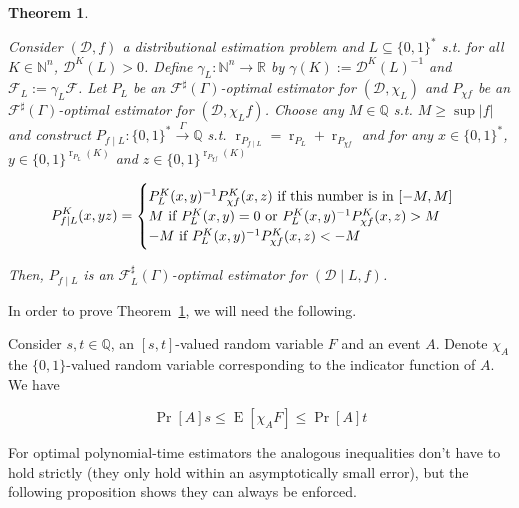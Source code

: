 \documentclass[11pt]{article}
\numberwithin{equation}{section}
\theoremstyle{definition}
\theoremstyle{plain}
\newtheorem{theorem}{Theorem}[section]
\newcommand{\Bool}{\{0,1\}}
\newcommand{\Words}{{\Bool^*}}
\DeclareMathOperator{\Prb}{Pr}
\DeclareMathOperator{\E}{E}
\DeclareMathOperator{\R}{r}
\newcommand{\Nats}{\mathbb{N}}
\newcommand{\Rats}{\mathbb{Q}}
\newcommand{\Reals}{\mathbb{R}}
\newcommand{\NatFun}{\Nats^n \rightarrow}
\newcommand{\Abs}[1]{\lvert #1 \rvert}
\newcommand{\Dist}{\mathcal{D}}
\newcommand{\Fall}{\mathcal{F}}
\newcommand{\ESG}{\Fall^\sharp(\Gamma)}
\newcommand{\BoolR}[1]{\Bool^{\R_{#1}(K)}}
\newcommand{\Scheme}{\xrightarrow{\Gamma}}
\begin{document}
\begin{samepage}
\begin{theorem}
\label{thm:cond}

Consider $(\Dist, f)$ a distributional estimation problem and ${L \subseteq \Words}$ s.t. for all $K \in \Nats^n$, $\Dist^K(L) > 0$. Define $\gamma_L: \NatFun \Reals$ by $\gamma(K):=\Dist^{K}(L)^{-1}$ and $\Fall_L:=\gamma_L \Fall$. Let $P_L$ be an $\ESG$-optimal estimator for $(\Dist, \chi_L)$ and $P_{\chi f}$ be an $\ESG$-optimal estimator for $(\Dist, \chi_L f)$. Choose any $M \in \Rats$ s.t. ${M \geq \sup \Abs{f}}$ and construct $P_{f \mid L}: \Words \Scheme \Rats$ s.t. $\R_{P_{f \mid L}} = \R_{P_L} + \R_{P_{\chi f}}$ and for any ${x \in \Words}$, ${y \in \BoolR{P_L}}$ and $z \in \BoolR{P_{\chi f}}$ 

\begin{equation}
P_{f \mid L}^K(x,yz)=\begin{cases}P_L^K(x,y)^{-1} P_{\chi f}^K(x,z) \textnormal{ if this number is in } [-M,M] \\ M \textnormal{ if } P_L^K(x,y)=0 \textnormal{ or } P_L^K(x,y)^{-1} P_{\chi f}^K(x,z) > M\\ -M \textnormal{ if } P_L^K(x,y)^{-1} P_{\chi f}^K(x,z) < -M\end{cases}
\end{equation}

Then, $P_{f \mid L}$ is an $\Fall_L^\sharp(\Gamma)$-optimal estimator for $(\Dist \mid L, f)$.

\end{theorem}
\end{samepage}

In order to prove Theorem~\ref{thm:cond}, we will need the following.

Consider $s,t \in \Rats$, an $[s,t]$-valued random variable $F$ and an event $A$. Denote $\chi_A$ the $\Bool$-valued random variable corresponding to the indicator function of $A$. We have 

\begin{equation}
\Prb[A]s \leq \E[\chi_A F] \leq \Prb[A]t
\end{equation}

For optimal polynomial-time estimators the analogous inequalities don't have to hold strictly (they only hold within an asymptotically small error), but the following proposition shows they can always be enforced.
\end{document}
